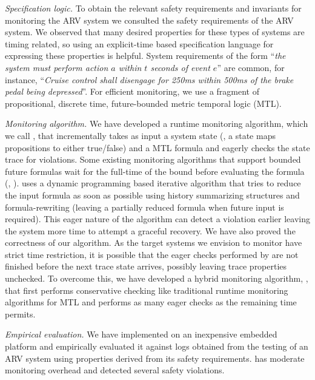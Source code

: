 \noindent
\textit{Specification logic.}
To obtain the relevant safety requirements and invariants for monitoring the ARV system we consulted the safety requirements of the ARV system.
We observed that many desired properties for these types of systems are timing related, so using an explicit-time based specification language for expressing these properties is helpful.
System requirements of the form ``\emph{the system must perform action $a$ within $t$ seconds of event $e$}'' are common, for instance, ``\emph{Cruise control shall disengage for 250ms within 500ms of the brake pedal being depressed}''.
%
For efficient monitoring, we use a fragment of propositional, discrete time, future-bounded metric temporal logic (MTL)\cite{Koymans1990}.

\noindent
\textit{Monitoring algorithm.}
We have developed a runtime monitoring algorithm, which we call \monitor, that incrementally takes as input a system state
(\ie, a state maps  propositions to either true/false) and a MTL formula and eagerly checks the state trace for violations.
Some existing monitoring algorithms that support bounded future formulas wait for the full-time of the bound before evaluating the formula (\eg, \cite{Basin2008}).
\monitor uses a dynamic programming based iterative algorithm that tries to reduce the input formula as soon as possible using history summarizing structures and formula-rewriting (leaving a partially reduced formula when future input is required).
This eager nature of the algorithm can detect a violation earlier leaving the system more time to attempt a graceful recovery.
We have also proved the correctness of our algorithm. As the target systems we envision to monitor
have strict time restriction,
it is possible that the eager checks performed by \monitor are not finished before the next trace state arrives, possibly leaving trace properties unchecked. 
To overcome this, we have developed a hybrid monitoring algorithm, \ha, that first performs conservative checking like traditional runtime monitoring algorithms for MTL and performs as many eager checks as the remaining time permits.

\noindent
\textit{Empirical evaluation.}
We have implemented \monitor on an inexpensive embedded platform and empirically evaluated it against logs obtained from the testing of an ARV system using properties derived from its safety requirements.
\monitor has moderate monitoring overhead and detected several safety violations.


